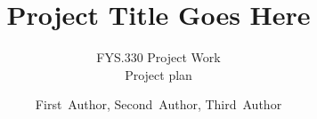 \documentclass{FYS330_report}
\title{Project Title Goes Here}{Project name}%
\subtitle{FYS.330 Project Work\\ Project plan}%
\author{First~Author, Second~Author, Third~Author} %
\begin{document}
\maketitle          %

\tableofcontents    %

\aidisclaimerinclusioncmd






\printbibliography
\end{document}
